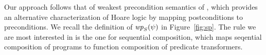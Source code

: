 


\begin{figure*}
  
  \caption{Weakest precondition semantics}
  \label{fig:sp}
\end{figure*}

Our approach follows that of weakest precondition semantics of
\citet{DBLP:journals/cacm/Dijkstra75}, which provides an alternative
characterization of Hoare logic \citep{Hoare:1969:ABC:363235.363259} by
mapping postconditions to preconditions. We recall the definition of
$\fwp{\aCmd}{\bForm}$ in Figure~\ref{fig:sp}. The rule we are most interested
in is the one for sequential composition, which maps seqential composition of programs
to function composition of predicate transformers.

